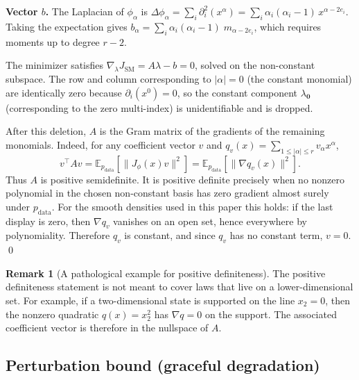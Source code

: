 \documentclass{article}
\newcommand{\E}{\mathbb{E}}
\theoremstyle{definition}
\newtheorem{remark}{Remark}
\begin{document}
\textbf{Vector $b$.}
The Laplacian of $\phi_\alpha$ is
$\Delta\phi_\alpha = \sum_i \partial_i^2(x^\alpha)
= \sum_i \alpha_i(\alpha_i - 1)\,x^{\alpha - 2e_i}$.
Taking the expectation gives
$b_\alpha = \sum_i \alpha_i(\alpha_i - 1)\; m_{\alpha - 2e_i}$,
which requires moments up to degree $r - 2$.

The minimizer satisfies $\nabla_\lambda J_{\mathrm{SM}} = A\lambda - b = 0$,
solved on the non-constant subspace.
The row and column corresponding to $|\alpha| = 0$ (the constant monomial)
are identically zero because $\partial_i(x^0) = 0$,
so the constant component $\lambda_{\mathbf{0}}$ (corresponding to the
zero multi-index) is unidentifiable and is dropped.

After this deletion, $A$ is the Gram matrix of the gradients of the
remaining monomials. Indeed, for any coefficient vector $v$ and
$q_v(x)=\sum_{1\le|\alpha|\le r}v_\alpha x^\alpha$,
\begin{equation}
    v^\top A v
    = \E_{p_{\mathrm{data}}}\!\left[\|J_\phi(x)v\|^2\right]
    = \E_{p_{\mathrm{data}}}\!\left[\|\nabla q_v(x)\|^2\right].
\end{equation}
Thus $A$ is positive semidefinite. It is positive definite precisely when
no nonzero polynomial in the chosen non-constant basis has zero gradient
almost surely under $p_{\mathrm{data}}$. For the smooth densities used in
this paper this holds: if the last display is zero, then $\nabla q_v$
vanishes on an open set, hence everywhere by polynomiality. Therefore
$q_v$ is constant, and since $q_v$ has no constant term, $v=0$.
\qed

\begin{remark}[A pathological example for positive definiteness]
The positive definiteness statement is not meant to cover laws that live
on a lower-dimensional set. For example, if a two-dimensional state is supported on
the line $x_2=0$, then the nonzero quadratic $q(x)=x_2^2$ has
$\nabla q=0$ on the support. The associated coefficient vector is
therefore in the nullspace of $A$.
\end{remark}

\subsection{Perturbation bound (graceful degradation)}
\label{app:perturbation}
\end{document}
